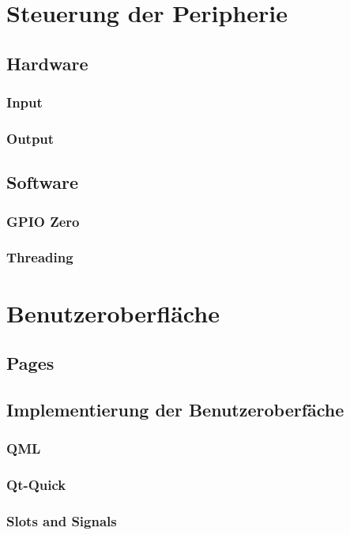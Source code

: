 
\section{Steuerung der Peripherie}
\subsection{Hardware}
\subsubsection{Input}
\subsubsection{Output}

\subsection{Software}
\subsubsection{GPIO Zero}
\subsubsection{Threading}


\section{Benutzeroberfläche}

\subsection{Pages}
\subsection{Implementierung der Benutzeroberfäche}
\subsubsection{QML}
\subsubsection{Qt-Quick}
\subsubsection{Slots and Signals}
